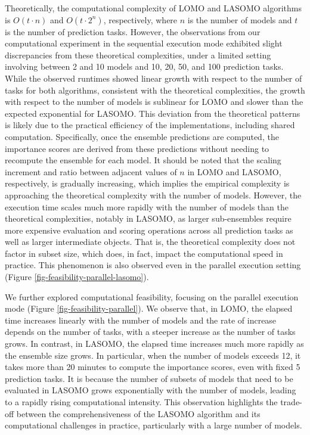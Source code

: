 \documentclass[
  article,
  shortnames,
  notitle]{jss}
\begin{document}
Theoretically, the computational complexity of LOMO and LASOMO
algorithms is \(O(t \cdot n)\) and \(O(t\cdot 2^n)\), respectively,
where \(n\) is the number of models and \(t\) is the number of
prediction tasks. However, the observations from our computational
experiment in the sequential execution mode exhibited slight
discrepancies from these theoretical complexities, under a limited
setting involving between 2 and 10 models and 10, 20, 50, and 100
prediction tasks. While the observed runtimes showed linear growth with
respect to the number of tasks for both algorithms, consistent with the
theoretical complexities, the growth with respect to the number of
models is sublinear for LOMO and slower than the expected exponential
for LASOMO. This deviation from the theoretical patterns is likely due
to the practical efficiency of the implementations, including shared
computation. Specifically, once the ensemble predictions are computed,
the importance scores are derived from these predictions without needing
to recompute the ensemble for each model. It should be noted that the
scaling increment and ratio between adjacent values of \(n\) in LOMO and
LASOMO, respectively, is gradually increasing, which implies the
empirical complexity is approaching the theoretical complexity with the
number of models. However, the execution time scales much more rapidly
with the number of models than the theoretical complexities, notably in
LASOMO, as larger sub-ensembles require more expensive evaluation and
scoring operations across all prediction tasks as well as larger
intermediate objects. That is, the theoretical complexity does not
factor in subset size, which does, in fact, impact the computational
speed in practice. This phenomenon is also observed even in the parallel
execution setting (Figure \ref{fig-feasibility-parallel-lasomo}).

We further explored computational feasibility, focusing on the parallel
execution mode (Figure \ref{fig-feasibility-parallel}). We observe that,
in LOMO, the elapsed time increases linearly with the number of models
and the rate of increase depends on the number of tasks, with a steeper
increase as the number of tasks grows. In contrast, in LASOMO, the
elapsed time increases much more rapidly as the ensemble size grows. In
particular, when the number of models exceeds 12, it takes more than 20
minutes to compute the importance scores, even with fixed 5 prediction
tasks. It is because the number of subsets of models that need to be
evaluated in LASOMO grows exponentially with the number of models,
leading to a rapidly rising computational intensity. This observation
highlights the trade-off between the comprehensiveness of the LASOMO
algorithm and its computational challenges in practice, particularly
with a large number of models.
\end{document}
